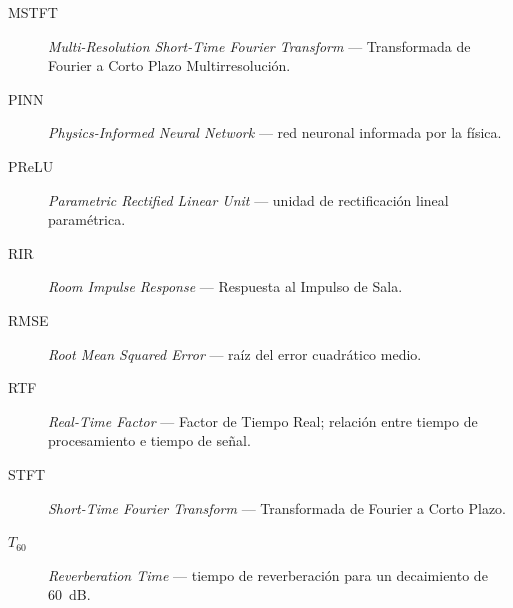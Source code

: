 \begin{description}
	\item[MSTFT] \textit{Multi-Resolution Short-Time Fourier Transform} — Transformada de Fourier a Corto Plazo Multirresolución.
	\item[PINN] \textit{Physics-Informed Neural Network} — red neuronal informada por la física.
	\item[PReLU] \textit{Parametric Rectified Linear Unit} — unidad de rectificación lineal paramétrica.
	\item[RIR] \textit{Room Impulse Response} — Respuesta al Impulso de Sala.
	\item[RMSE] \textit{Root Mean Squared Error} — raíz del error cuadrático medio.
	\item[RTF] \textit{Real-Time Factor} — Factor de Tiempo Real; relación entre tiempo de procesamiento e tiempo de señal.
	\item[STFT] \textit{Short-Time Fourier Transform} — Transformada de Fourier a Corto Plazo.
	\item[$T_{60}$] \textit{Reverberation Time} — tiempo de reverberación para un decaimiento de 60~dB.
\end{description}